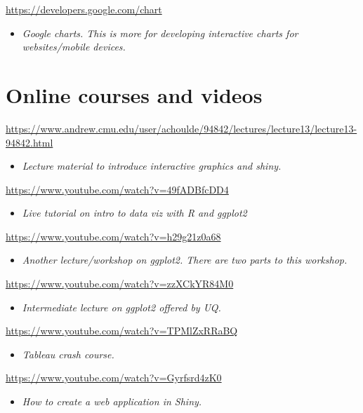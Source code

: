 \documentclass[
]{book}
\providecommand{\tightlist}{%
  \setlength{\itemsep}{0pt}\setlength{\parskip}{0pt}}
\begin{document}
\url{https://developers.google.com/chart}

\begin{itemize}
\tightlist
\item
  \emph{Google charts. This is more for developing interactive charts for websites/mobile devices.}
\end{itemize}

\section{Online courses and videos}\label{online-courses-and-videos}

\url{https://www.andrew.cmu.edu/user/achoulde/94842/lectures/lecture13/lecture13-94842.html}

\begin{itemize}
\tightlist
\item
  \emph{Lecture material to introduce interactive graphics and shiny.}
\end{itemize}

\url{https://www.youtube.com/watch?v=49fADBfcDD4}

\begin{itemize}
\tightlist
\item
  \emph{Live tutorial on intro to data viz with R and ggplot2}
\end{itemize}

\url{https://www.youtube.com/watch?v=h29g21z0a68}

\begin{itemize}
\tightlist
\item
  \emph{Another lecture/workshop on ggplot2. There are two parts to this workshop.}
\end{itemize}

\url{https://www.youtube.com/watch?v=zzXCkYR84M0}

\begin{itemize}
\tightlist
\item
  \emph{Intermediate lecture on ggplot2 offered by UQ.}
\end{itemize}

\url{https://www.youtube.com/watch?v=TPMlZxRRaBQ}

\begin{itemize}
\tightlist
\item
  \emph{Tableau crash course.}
\end{itemize}

\url{https://www.youtube.com/watch?v=Gyrfsrd4zK0}

\begin{itemize}
\tightlist
\item
  \emph{How to create a web application in Shiny.}
\end{itemize}
\end{document}
